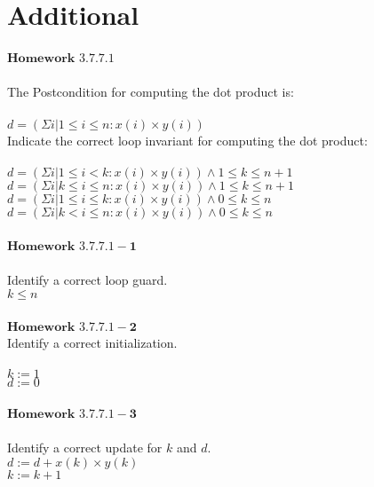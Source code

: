 \documentclass{article}
\author{Krystal Maughan }
\date{May 4th 2017}
\begin{document}
\section{Additional}
$\mathbf{Homework}$ $\mathbf{3.7.7.1}$
\\
\\
The Postcondition for computing the dot product is:
\\
\\
$ d = (\Sigma i | 1 \leq i \leq n : x(i) \times y(i))$
\\
Indicate the correct loop invariant for computing the dot product:
\\
\\
$d = (\Sigma i | 1 \leq i < k : x(i) \times y(i)) \land 1 \leq k \leq n + 1$
\\
$d = (\Sigma i | k \leq i \leq n : x(i) \times y(i)) \land 1 \leq k \leq n + 1$
\\
$d = (\Sigma i | 1 \leq i \leq k : x(i) \times y(i)) \land 0 \leq k \leq n$
\\
$d = (\Sigma i | k < i \leq n : x(i) \times y(i)) \land 0 \leq k \leq n$
\\
\\
$\mathbf{Homework}$ $\mathbf{3.7.7.1-1}$
\\
\\
Identify a correct loop guard.
\\
$ k \leq n$
\\
\\
$\mathbf{Homework}$ $\mathbf{3.7.7.1-2}$
\\
Identify a correct initialization.
\\
\\
$ k := 1$
\\
$ d := 0$
\\
\\
$\mathbf{Homework}$ $\mathbf{3.7.7.1-3}$
\\
\\
Identify a correct update for $k$ and $d$.
\\
$d := d + x(k) \times y(k)$
\\
$k := k + 1$
\\
\\
\end{document}
